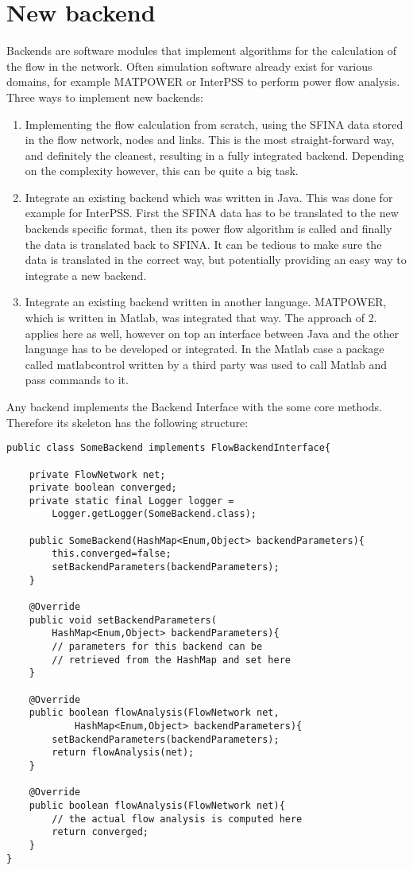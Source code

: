 \documentclass[11pt,fleqn]{book} %
\begin{document}
\section{New backend}\label{sec:backend}
Backends are software modules that implement algorithms for the calculation of the flow in the network. Often simulation software already exist for various domains, for example MATPOWER or InterPSS to perform power flow analysis. Three ways to implement new backends:
\begin{enumerate}
	\item Implementing the flow calculation from scratch, using the SFINA data stored in the flow network, nodes and links. This is the most straight-forward way, and definitely the cleanest, resulting in a fully integrated backend. Depending on the complexity however, this can be quite a big task.
	\item Integrate an existing backend which was written in Java. This was done for example for InterPSS. First the SFINA data has to be translated to the new backends specific format, then its power flow algorithm is called and finally the data is translated back to SFINA. It can be tedious to make sure the data is translated in the correct way, but potentially providing an easy way to integrate a new backend.
	\item Integrate an existing backend written in another language. MATPOWER, which is written in Matlab, was integrated that way. The approach of 2. applies here as well, however on top an interface between Java and the other language has to be developed or integrated. In the Matlab case a package called matlabcontrol written by a third party was used to call Matlab and pass commands to it.
\end{enumerate}

Any backend implements the Backend Interface with the some core methods. Therefore its skeleton has the following structure:

\begin{lstlisting}[frame=single]
public class SomeBackend implements FlowBackendInterface{
    
    private FlowNetwork net;
    private boolean converged;
    private static final Logger logger = 
    	Logger.getLogger(SomeBackend.class);
    
    public SomeBackend(HashMap<Enum,Object> backendParameters){
        this.converged=false;
        setBackendParameters(backendParameters);
    }

    @Override
    public void setBackendParameters(
    	HashMap<Enum,Object> backendParameters){
        // parameters for this backend can be 
        // retrieved from the HashMap and set here
    }
    
    @Override
    public boolean flowAnalysis(FlowNetwork net, 
    		HashMap<Enum,Object> backendParameters){
        setBackendParameters(backendParameters);
        return flowAnalysis(net);
    }
    
    @Override
    public boolean flowAnalysis(FlowNetwork net){
        // the actual flow analysis is computed here
        return converged;
    }
}
\end{lstlisting}
\end{document}
